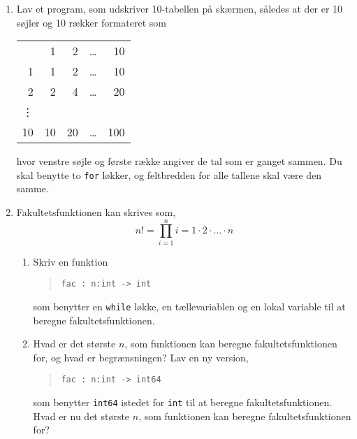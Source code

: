 \documentclass[a4paper,12pt]{article}
\begin{document}
\begin{enumerate}[label=3ø.\arabic*,start=0]
\item \label{multiplicationTable} Lav et program, som udskriver 10-tabellen på skærmen, således at der er 10 søjler og 10 rækker formateret som
  \begin{center}
    \begin{tabular}{rrrrr}
      &1 & 2 & \dots & 10\\
      1 &1 & 2 & \dots & 10\\
      2 &2 & 4 & \dots & 20\\
      \vdots \\
      10 &10 & 20 & \dots & 100\\
    \end{tabular}
  \end{center}
hvor venstre søjle og første række angiver de tal som er ganget sammen. Du skal benytte to \lstinline!for! løkker, og feltbredden for alle tallene skal være den samme. 
\item Fakultetsfunktionen kan skrives som,
  \begin{equation}
    n! = \prod_{i=1}^n i = 1\cdot 2\cdot \ldots \cdot n
  \end{equation}
  \begin{enumerate}
  \item Skriv en funktion
    \begin{quote}
      \mbox{\lstinline!fac : n:int -> int!}
    \end{quote}
    som benytter en \lstinline!while! løkke, en tællevariablen og en lokal variable til at beregne fakultetsfunktionen.
  \item Hvad er det største $n$, som funktionen kan beregne fakultetsfunktionen for, og hvad er begrænsningen? Lav en ny version, 
    \begin{quote}
      \mbox{\lstinline!fac : n:int -> int64!}
    \end{quote}
    som benytter \lstinline{int64} istedet for \lstinline{int} til at beregne fakultetsfunktionen. Hvad er nu det største $n$, som funktionen kan beregne fakultetsfunktionen for?
  \end{enumerate}
\end{enumerate}
\end{document}
